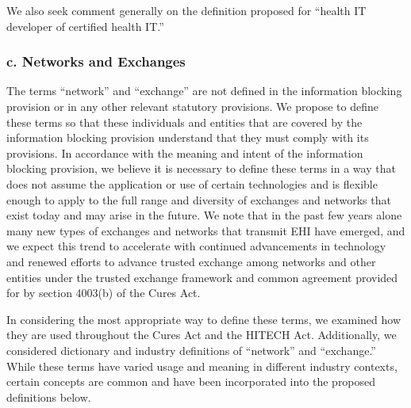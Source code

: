 \documentclass[twoside,11pt]{article}
\begin{document}




          We also seek comment generally on the definition proposed for “health IT developer of certified health IT.”


          \subsubsection{c. Networks and Exchanges}

          The terms “network” and “exchange” are not defined in the information blocking provision or in any other relevant statutory provisions. We propose to define these terms so that these individuals and entities that are covered by the information blocking provision understand that they must comply with its provisions. In accordance with the meaning and intent of the information blocking provision, we believe it is necessary to define these terms in a way that does not assume the application or use of certain technologies and is flexible enough to apply to the full range and diversity of exchanges and networks that exist today and may arise in the future. We note that in the past few years alone many new types of exchanges and networks that transmit EHI have emerged, and we expect this trend to accelerate with continued advancements in technology and renewed efforts to advance trusted exchange among networks and other entities under the trusted exchange framework and common agreement provided for by section 4003(b) of the Cures Act.


          In considering the most appropriate way to define these terms, we examined how they are used throughout the Cures Act and the HITECH Act. Additionally, we considered dictionary and industry definitions of “network” and “exchange.” While these terms have varied usage and meaning in different industry contexts, certain concepts are common and have been incorporated into the proposed definitions below.
\end{document}
